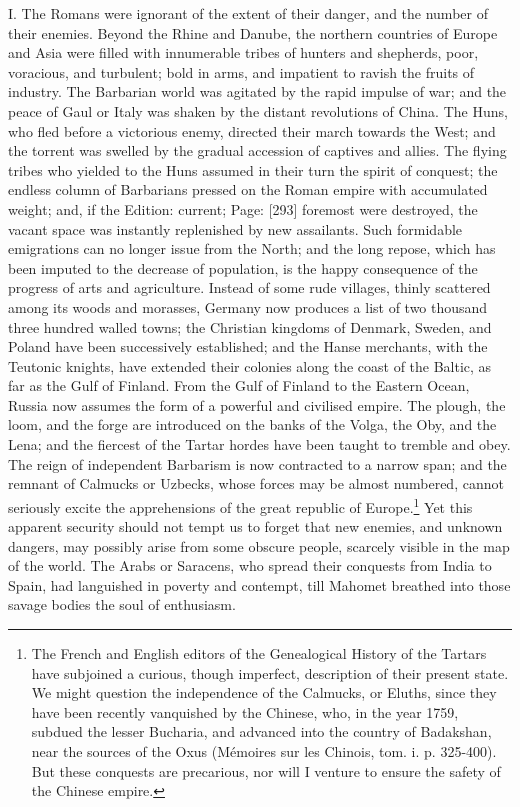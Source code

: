 I. The Romans were ignorant of the extent of their danger, and the number of their enemies. Beyond the Rhine and Danube, the northern countries of Europe and Asia were filled with innumerable tribes of hunters and shepherds, poor, voracious, and turbulent; bold in arms, and impatient to ravish the fruits of industry. The Barbarian world was agitated by the rapid impulse of war; and the peace of Gaul or Italy was shaken by the distant revolutions of China. The Huns, who fled before a victorious enemy, directed their march towards the West; and the torrent was swelled by the gradual accession of captives and allies. The flying tribes who yielded to the Huns assumed in their turn the spirit of conquest; the endless column of Barbarians pressed on the Roman empire with accumulated weight; and, if the Edition: current; Page: [293] foremost were destroyed, the vacant space was instantly replenished by new assailants. Such formidable emigrations can no longer issue from the North; and the long repose, which has been imputed to the decrease of population, is the happy consequence of the progress of arts and agriculture. Instead of some rude villages, thinly scattered among its woods and morasses, Germany now produces a list of two thousand three hundred walled towns; the Christian kingdoms of Denmark, Sweden, and Poland have been successively established; and the Hanse merchants, with the Teutonic knights, have extended their colonies along the coast of the Baltic, as far as the Gulf of Finland. From the Gulf of Finland to the Eastern Ocean, Russia now assumes the form of a powerful and civilised empire. The plough, the loom, and the forge are introduced on the banks of the Volga, the Oby, and the Lena; and the fiercest of the Tartar hordes have been taught to tremble and obey. The reign of independent Barbarism is now contracted to a narrow span; and the remnant of Calmucks or Uzbecks, whose forces may be almost numbered, cannot seriously excite the apprehensions of the great republic of Europe.\footnote{The French and English editors of the Genealogical History of the Tartars have subjoined a curious, though imperfect, description of their present state. We might question the independence of the Calmucks, or Eluths, since they have been recently vanquished by the Chinese, who, in the year 1759, subdued the lesser Bucharia, and advanced into the country of Badakshan, near the sources of the Oxus (Mémoires sur les Chinois, tom. i. p. 325-400). But these conquests are precarious, nor will I venture to ensure the safety of the Chinese empire.} Yet this apparent security should not tempt us to forget that new enemies, and unknown dangers, may possibly arise from some obscure people, scarcely visible in the map of the world. The Arabs or Saracens, who spread their conquests from India to Spain, had languished in poverty and contempt, till Mahomet breathed into those savage bodies the soul of enthusiasm.


